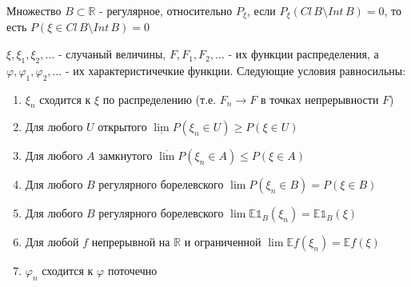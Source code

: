 \begin{definition}
    Множество $B \subset \mathbb{R}$ - регулярное, относительно $P_{\xi}$, если $P_{\xi} (Cl \, B \setminus Int \, B) = 0$,
    то есть $P(\xi \in Cl \, B \setminus Int \, B) = 0$
\end{definition}

\begin{theorem}
    $\xi, \xi_1, \xi_2, \ldots$ - случаный величины, $F, F_1, F_2, \ldots$ - их функции распределения, а
    $\varphi, \varphi_1, \varphi_2, \ldots$ - их характеристичечкие функции. Следующие условия равносильны:

    \begin{enumerate}
        \item $\xi_n$ сходится к $\xi$ по распределению (т.е. $F_n \to F$ в точках непрерывности $F$)
        \item Для любого $U$ открытого $\underline{\lim} P(\xi_n \in U) \geqslant P(\xi \in U)$
        \item Для любого $A$ замкнутого $\overline{\lim} P(\xi_n \in A) \leqslant P(\xi \in A)$
        \item Для любого $B$ регулярного борелевского $\lim P(\xi_n \in B) = P(\xi \in B)$
        \item Для любого $B$ регулярного борелевского $\lim \mathbb{E} \mathds{1}_{B}(\xi_n) = \mathbb{E} \mathds{1}_B (\xi)$
        \item Для любой $f$ непрерывной на $\mathbb{R}$ и ограниченной $\lim \mathbb{E} f(\xi_n) = \mathbb{E} f(\xi)$
        \item $\varphi_n$ сходится к $\varphi$ поточечно
    \end{enumerate}
\end{theorem}


